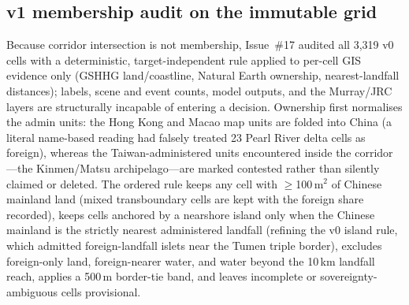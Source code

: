 \subsection{v1 membership audit on the immutable grid}
Because corridor intersection is not membership, Issue~\#17 audited all
3{,}319 v0 cells with a deterministic, target-independent rule applied
to per-cell GIS evidence only (GSHHG land/coastline, Natural Earth
ownership, nearest-landfall distances); labels, scene and event counts,
model outputs, and the Murray/JRC layers are structurally incapable of
entering a decision. Ownership first normalises the admin units: the
Hong Kong and Macao map units are folded into China (a literal
name-based reading had falsely treated 23 Pearl River delta cells as
foreign), whereas the Taiwan-administered units encountered inside the
corridor---the Kinmen/Matsu archipelago---are marked contested rather
than silently claimed or deleted. The ordered rule keeps any cell with
$\geq$100\,m$^2$ of Chinese mainland land (mixed transboundary cells
are kept with the foreign share recorded), keeps cells anchored by a
nearshore island only when the Chinese mainland is the strictly nearest
administered landfall (refining the v0 island rule, which admitted
foreign-landfall islets near the Tumen triple border), excludes
foreign-only land, foreign-nearer water, and water beyond the 10\,km
landfall reach, applies a 500\,m border-tie band, and leaves
incomplete or sovereignty-ambiguous cells provisional.

